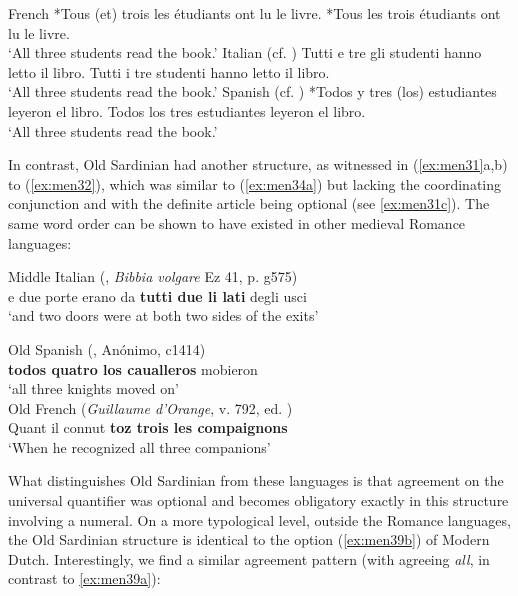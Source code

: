 \documentclass[output=paper,colorlinks,citecolor=brown]{langscibook}
\begin{document}
\ea\label{ex:men33} 
French
\ea\label{ex:men33a}  *Tous (et) trois les étudiants ont  lu le livre.
\ex\label{ex:men33b}  *Tous les trois étudiants ont lu le livre.\\
‘All three students read the book.’
\z 
\ex\label{ex:men34}
Italian (cf. \cite[][7]{Balsadella2017})
\ea\label{ex:men34a} Tutti e tre gli studenti hanno letto il libro.  
\ex\label{ex:men34b} Tutti i tre studenti hanno letto il libro.\\
‘All three students read the book.’
\z
\ex\label{ex:men35}
Spanish (cf. \cite[][173]{Cirillo2009})
\ea\label{ex:men35a} *Todos y tres (los) estudiantes leyeron el libro.
\ex\label{ex:men35b} Todos los tres estudiantes leyeron el libro.\\
‘All three students read the book.’
\z
\z

In contrast, Old Sardinian had another structure, as witnessed in (\ref{ex:men31}a,b) to (\ref{ex:men32}), which was similar to (\ref{ex:men34a}) but lacking the coordinating conjunction and with the definite article being optional (see \ref{ex:men31c}). The same word order can be shown to have existed in other medieval Romance languages:

\ea\label{ex:men36}
Middle Italian (\emph{}, \textit{Bibbia volgare} Ez 41, p. g575)\\
e due porte erano da \textbf{tutti due li lati} degli usci\\
‘and two doors were at both two sides of the exits’

\ex\label{ex:men37}
Old Spanish (\emph{}, Anónimo, c1414)\\
\textbf{todos	quatro	los	caualleros}	mobieron\\
 ‘all three knights moved on’\\

\ex\label{ex:men38}
Old French (\textit{Guillaume d'Orange}, v. 792, ed. \cite[134]{Jonckbloet1854})\\
Quant	il 	connut 	\textbf{toz	trois	les	compaignons}\\
‘When he recognized all three companions’
\z

What distinguishes Old Sardinian from these languages is that agreement on the universal quantifier was optional and becomes obligatory exactly in this structure involving a numeral. On a more typological level, outside the Romance languages, the Old Sardinian structure is identical to the option (\ref{ex:men39b}) of Modern Dutch. Interestingly, we find a similar agreement pattern (with agreeing \textit{all}, in contrast to \ref{ex:men39a}):
\end{document}
